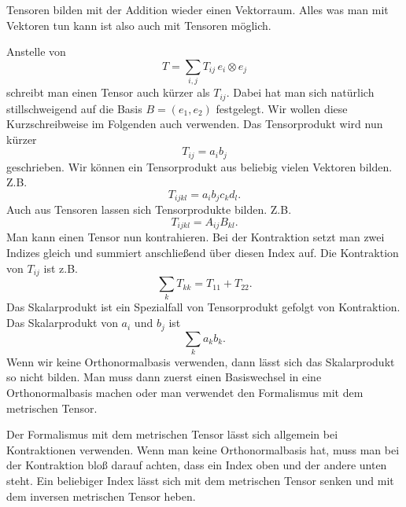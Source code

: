 \documentclass[a4paper,10pt,fleqn,twocolumn,twoside]{article}
\begin{document}
Tensoren bilden mit der Addition wieder einen Vektorraum.
Alles was man mit Vektoren tun kann ist also auch mit Tensoren
möglich.

Anstelle von
\[T = \sum_{i,j} T_{ij}\,e_i\otimes e_j\]
schreibt man einen Tensor auch kürzer als $T_{ij}$.
Dabei hat man sich natürlich stillschweigend auf die
Basis $B=(e_1,e_2)$ festgelegt.
Wir wollen diese Kurzschreibweise im Folgenden auch verwenden.
Das Tensorprodukt wird nun kürzer
\[T_{ij} = a_ib_j\]
geschrieben. Wir können ein Tensorprodukt aus beliebig vielen
Vektoren bilden. Z.B.
\[T_{ijkl} = a_ib_jc_kd_l.\]
Auch aus Tensoren lassen sich Tensorprodukte bilden. Z.B.
\[T_{ijkl} = A_{ij}B_{kl}.\]
Man kann einen Tensor nun kontrahieren.
Bei der Kontraktion setzt man zwei Indizes gleich und summiert
anschließend über diesen Index auf. Die Kontraktion von $T_{ij}$
ist z.B.
\[\sum_{k} T_{kk} = T_{11}+T_{22}.\]
Das Skalarprodukt ist ein Spezialfall von Tensorprodukt gefolgt von
Kontraktion. Das Skalarprodukt von $a_i$ und $b_j$ ist
\[\sum_{k} a_kb_k.\]
Wenn wir keine Orthonormalbasis verwenden, dann lässt sich das
Skalarprodukt so nicht bilden. Man muss dann zuerst einen
Basiswechsel in eine Orthonormalbasis machen oder man verwendet
den Formalismus mit dem metrischen Tensor.

Der Formalismus mit dem metrischen Tensor lässt sich allgemein
bei Kontraktionen verwenden. Wenn man keine Orthonormalbasis hat,
muss man bei der Kontraktion bloß darauf achten, dass ein Index
oben und der andere unten steht. Ein beliebiger Index lässt sich
mit dem metrischen Tensor senken und mit dem inversen metrischen
Tensor heben.
\end{document}
